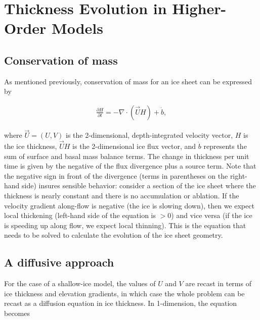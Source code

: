 
\section{Thickness Evolution in Higher-Order Models}
\label{sc:ho-thickness-evol}

\subsection{Conservation of mass}
As mentioned previously, conservation of mass for an ice sheet can be expressed by

\begin{align*}
\frac{\partial H}{\partial t}=-\nabla \cdot \left( \vec{U}H \right)+\dot{b},
\end{align*}

where $\vec{U}=(U,V)$ is the 2-dimensional, depth-integrated velocity vector, $H$ is the ice thickness, $\vec{U}H$ is the 2-dimensional ice flux vector, and $\dot{b}$ represents the sum of surface and basal mass balance terms. The change in thickness per unit time is given by the negative of the flux divergence plus a source term. 
%
%
Note that the negative sign in front of the divergence (terms in parentheses on the right-hand side) insures sensible behavior: consider a section of the ice sheet where the thickness is nearly constant and there is no accumulation or ablation. If the velocity gradient along-flow is negative (the ice is slowing down), then we expect local thickening (left-hand side of the equation is $>0$) and vice versa (if the ice is speeding up along flow, we expect local thinning). This is the equation that needs to be solved to calculate the evolution of the ice sheet geometry.

\subsection{A diffusive approach}
For the case of a shallow-ice model, the values of $U$ and $V$ are recast in terms of ice thickness and elevation gradients, in which case the whole problem can be recast as a diffusion equation in ice thickness. In 1-dimension, the equation becomes

